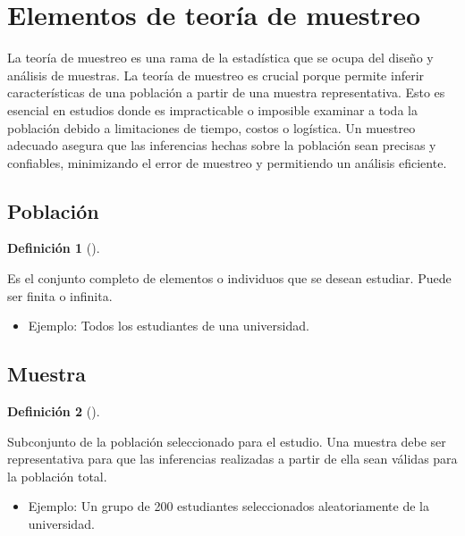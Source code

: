 \documentclass[
  us-letterpaper,
]{scrreprt}
\providecommand{\tightlist}{%
  \setlength{\itemsep}{0pt}\setlength{\parskip}{0pt}}\usepackage{longtable,booktabs,array}
\theoremstyle{plain}
\theoremstyle{plain}
\theoremstyle{definition}
\newtheorem{definition}{Definición}[chapter]
\theoremstyle{remark}
\begin{document}
\section{Elementos de teoría de
muestreo}\label{elementos-de-teoruxeda-de-muestreo}

La teoría de muestreo es una rama de la estadística que se ocupa del
diseño y análisis de muestras. La teoría de muestreo es crucial porque
permite inferir características de una población a partir de una muestra
representativa. Esto es esencial en estudios donde es impracticable o
imposible examinar a toda la población debido a limitaciones de tiempo,
costos o logística. Un muestreo adecuado asegura que las inferencias
hechas sobre la población sean precisas y confiables, minimizando el
error de muestreo y permitiendo un análisis eficiente.

\subsection{Población}\label{poblaciuxf3n}

\begin{definition}[]\protect\hypertarget{def-poblacion}{}\label{def-poblacion}

Es el conjunto completo de elementos o individuos que se desean
estudiar. Puede ser finita o infinita.

\end{definition}

\begin{itemize}
\tightlist
\item
  Ejemplo: Todos los estudiantes de una universidad.
\end{itemize}

\subsection{Muestra}\label{muestra}

\begin{definition}[]\protect\hypertarget{def-muestra}{}\label{def-muestra}

Subconjunto de la población seleccionado para el estudio. Una muestra
debe ser representativa para que las inferencias realizadas a partir de
ella sean válidas para la población total.

\begin{itemize}
\tightlist
\item
  Ejemplo: Un grupo de 200 estudiantes seleccionados aleatoriamente de
  la universidad.
\end{itemize}

\end{definition}
\end{document}
